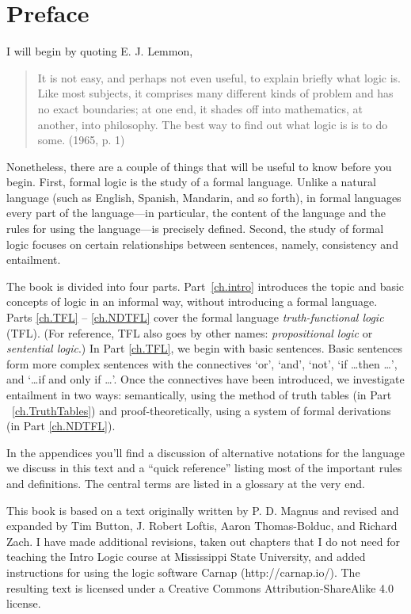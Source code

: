 \chapter{Preface}

I will begin by quoting E. J. Lemmon,
\begin{quote}
It is not easy, and perhaps not even useful, to explain briefly what logic is. Like most subjects, it comprises many different kinds of problem and has no exact boundaries; at one end, it shades off into mathematics, at another, into philosophy. The best way to find out what logic is is to do some. (1965, p. 1)
\end{quote}
Nonetheless, there are a couple of things that will be useful to know before you begin. First, formal logic is the study of a formal language. Unlike a natural language (such as English, Spanish, Mandarin, and so forth), in formal languages every part of the language—in particular, the content of the language and the rules for using the language—is precisely defined. Second, the study of formal logic focuses on certain relationships between sentences, namely, consistency and entailment.  

The book is divided into four parts. Part~\ref{ch.intro} introduces the topic and basic concepts of logic in an informal way, without introducing a formal language. Parts \ref{ch.TFL} -- \ref{ch.NDTFL} cover the formal language \textit{truth-functional logic} (TFL). (For reference, TFL also goes by other names: \textit{propositional logic} or \textit{sentential logic}.) In Part \ref{ch.TFL}, we begin with basic sentences. Basic sentences form more complex sentences with the connectives ‘or’, ‘and’, ‘not’, ‘if \ldots then \ldots’, and `\ldots if and only if \ldots'. Once the connectives have been introduced, we investigate entailment in two ways: semantically, using the method of truth tables (in Part ~\ref{ch.TruthTables}) and proof-theoretically, using a system of formal derivations (in Part \ref{ch.NDTFL}). 

In the appendices you’ll find a discussion of alternative notations for the language we discuss in this text and a ``quick reference'' listing most of the important rules and definitions. The central terms are listed in a glossary at the very end.

This book is based on a text originally written by P. D. Magnus and revised and expanded by Tim Button, J. Robert Loftis, Aaron Thomas-Bolduc, and Richard Zach. I have made additional revisions, taken out chapters that I do not need for teaching the Intro Logic course at Mississippi State University, and added instructions for using the logic software Carnap (http://carnap.io/). The resulting text is licensed under a Creative Commons Attribution-ShareAlike 4.0 license.

